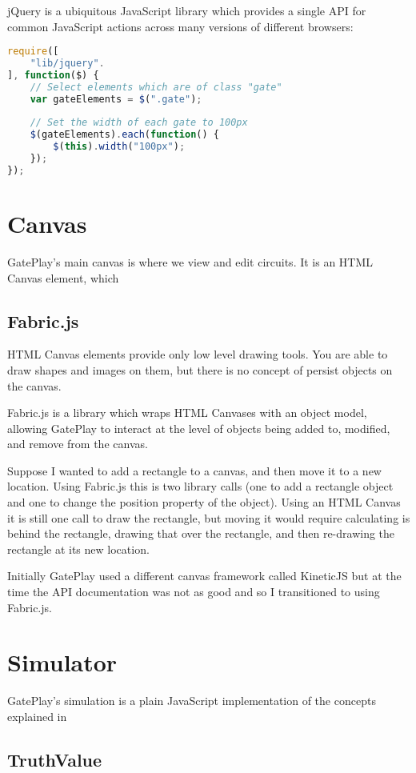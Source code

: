 jQuery is a ubiquitous JavaScript library which provides a single API for common JavaScript actions across many versions of different browsers:

\begin{lstlisting}[language=JavaScript]
require([
	"lib/jquery".
], function($) {
	// Select elements which are of class "gate"
	var gateElements = $(".gate");
	
	// Set the width of each gate to 100px
	$(gateElements).each(function() {
		$(this).width("100px");
	});
});
\end{lstlisting}

\section{Canvas}
GatePlay's main canvas is where we view and edit circuits. It is an HTML Canvas element, which


\subsection{Fabric.js}
HTML Canvas elements provide only low level drawing tools. You are able to draw shapes and images on them, but there is no concept of persist objects on the canvas.

Fabric.js is a library which wraps HTML Canvases with an object model, allowing GatePlay to interact at the level of objects being added to, modified, and remove from the canvas. 

Suppose I wanted to add a rectangle to a canvas, and then move it to a new location. Using Fabric.js this is two library calls (one to add a rectangle object and one to change the position property of the object). Using an HTML Canvas it is still one call to draw the rectangle, but moving it would require calculating is behind the rectangle, drawing that over the rectangle, and then re-drawing the rectangle at its new location.

Initially GatePlay used a different canvas framework called KineticJS but at the time the API documentation was not as good and so I transitioned to using Fabric.js.

\section{Simulator}
GatePlay's simulation is a plain JavaScript implementation of the concepts explained in 

\subsection{TruthValue}


